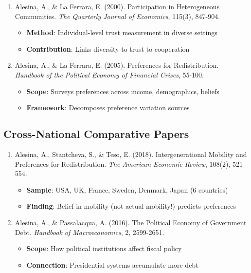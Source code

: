 \begin{enumerate}

\item Alesina, A., \& La Ferrara, E. (2000). Participation in Heterogeneous Communities. \emph{The Quarterly Journal of Economics}, 115(3), 847-904.
   \begin{itemize}
   \item \textbf{Method}: Individual-level trust measurement in diverse settings
   \item \textbf{Contribution}: Links diversity to trust to cooperation
   \end{itemize}

\item Alesina, A., \& La Ferrara, E. (2005). Preferences for Redistribution. \emph{Handbook of the Political Economy of Financial Crises}, 55-100.
   \begin{itemize}
   \item \textbf{Scope}: Surveys preferences across income, demographics, beliefs
   \item \textbf{Framework}: Decomposes preference variation sources
   \end{itemize}

\end{enumerate}

\subsection{Cross-National Comparative Papers}

\begin{enumerate}

\item Alesina, A., Stantcheva, S., \& Teso, E. (2018). Intergenerational Mobility and Preferences for Redistribution. \emph{The American Economic Review}, 108(2), 521-554.
   \begin{itemize}
   \item \textbf{Sample}: USA, UK, France, Sweden, Denmark, Japan (6 countries)
   \item \textbf{Finding}: Belief in mobility (not actual mobility!) predicts preferences
   \end{itemize}

\item Alesina, A., \& Passalacqua, A. (2016). The Political Economy of Government Debt. \emph{Handbook of Macroeconomics}, 2, 2599-2651.
   \begin{itemize}
   \item \textbf{Scope}: How political institutions affect fiscal policy
   \item \textbf{Connection}: Presidential systems accumulate more debt
   \end{itemize}

\end{enumerate}

